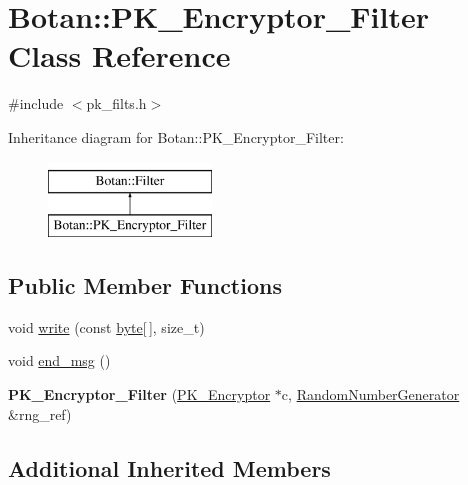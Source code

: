 \hypertarget{classBotan_1_1PK__Encryptor__Filter}{\section{Botan\-:\-:P\-K\-\_\-\-Encryptor\-\_\-\-Filter Class Reference}
\label{classBotan_1_1PK__Encryptor__Filter}
}


{\ttfamily \#include $<$pk\-\_\-filts.\-h$>$}

Inheritance diagram for Botan\-:\-:P\-K\-\_\-\-Encryptor\-\_\-\-Filter\-:\begin{figure}[H]
\begin{center}
\leavevmode
\includegraphics[height=2.000000cm]{classBotan_1_1PK__Encryptor__Filter}
\end{center}
\end{figure}
\subsection*{Public Member Functions}
\begin{DoxyCompactItemize}
\item 
void \hyperlink{classBotan_1_1PK__Encryptor__Filter_a7b39173e3f2474862935a19457552281}{write} (const \hyperlink{namespaceBotan_a7d793989d801281df48c6b19616b8b84}{byte}\mbox{[}$\,$\mbox{]}, size\-\_\-t)
\item 
void \hyperlink{classBotan_1_1PK__Encryptor__Filter_aa17c87716a13b4b36d863f80c5932aa4}{end\-\_\-msg} ()
\item 
\hypertarget{classBotan_1_1PK__Encryptor__Filter_afad309f39f59f49ec72d3e9056b463eb}{{\bfseries P\-K\-\_\-\-Encryptor\-\_\-\-Filter} (\hyperlink{classBotan_1_1PK__Encryptor}{P\-K\-\_\-\-Encryptor} $\ast$c, \hyperlink{classBotan_1_1RandomNumberGenerator}{Random\-Number\-Generator} \&rng\-\_\-ref)}\label{classBotan_1_1PK__Encryptor__Filter_afad309f39f59f49ec72d3e9056b463eb}

\end{DoxyCompactItemize}
\subsection*{Additional Inherited Members}


